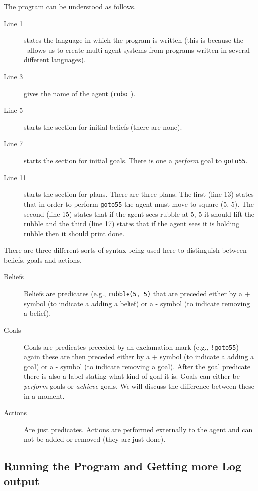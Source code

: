 \documentclass[a4]{article}
\begin{document}
The program can be understood as follows.  
\begin{description}
\item[Line 1] states the language in which the program is written (this is because the \ail\ allows us to create multi-agent systems from programs written in several different languages).  
\item[Line 3] gives the name of the agent (\lstinline{robot}).  
\item[Line 5] starts the section for initial beliefs (there are none).  
\item[Line 7] starts the section for initial goals.  There is one a \emph{perform} goal to \lstinline{goto55}.
\item[Line 11] starts the section for plans.  There are three plans.  The first (line 13) states that in order to perform \lstinline{goto55} the agent must move to square (5, 5).  The second (line 15) states that if the agent sees rubble at 5, 5 it should lift the rubble and the third  (line 17) states that if the agent sees it is holding rubble then it should print done.
\end{description}

There are three different sorts of syntax being used here to distinguish between beliefs, goals and actions.

\begin{description}
\item[Beliefs] Beliefs are predicates (e.g., \lstinline{rubble(5, 5)} that are preceded either by a + symbol (to indicate a adding a belief) or a - symbol (to indicate removing a belief).
\item[Goals] Goals are predicates preceded by an exclamation mark (e.g., \lstinline{!goto55}) again these are then preceded  either by a + symbol (to indicate a adding a goal) or a - symbol (to indicate removing a goal).  After the goal predicate there is also a label stating what kind of goal it is.  Goals can either be \emph{perform} goals or \emph{achieve} goals.  We will discuss the difference between these in a moment.
\item[Actions] Are just predicates.  Actions are performed externally to the agent and can not be added or removed (they are just done).
\end{description}

\subsection{Running the Program and Getting more Log output}
\end{document}
